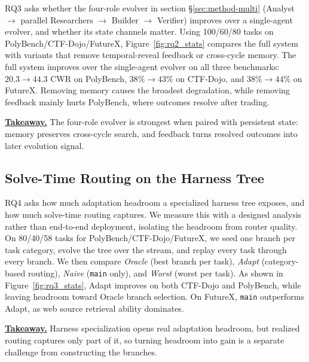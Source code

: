 RQ3 asks whether the four-role evolver in section \S\ref{sec:method-multi} (Analyst $\to$ parallel Researchers $\to$ Builder $\to$ Verifier) improves over a single-agent evolver, and whether its state channels matter. Using 100/60/80 tasks on PolyBench/CTF-Dojo/FutureX, Figure~\ref{fig:rq2_stats} compares the full system with variants that remove temporal-reveal feedback or cross-cycle memory. The full system improves over the single-agent evolver on all three benchmarks: $20.3 \to 44.3$ CWR on PolyBench, $38\% \to 43\%$ on CTF-Dojo, and $38\% \to 44\%$ on FutureX. Removing memory causes the broadest degradation, while removing feedback mainly hurts PolyBench, where outcomes resolve after trading. 

\noindent\underline{\textbf{Takeaway.}} The four-role evolver is strongest when paired with persistent state: memory preserves cross-cycle search, and feedback turns resolved outcomes into later evolution signal.



\subsection{Solve-Time Routing on the Harness Tree}
\label{sec:navloss}

RQ4 asks how much adaptation headroom a specialized harness tree exposes, and how much solve-time routing captures. We measure this with a designed analysis rather than end-to-end deployment, isolating the headroom from router quality. On 80/40/58 tasks for PolyBench/CTF-Dojo/FutureX, we seed one branch per task category, evolve the tree over the stream, and replay every task through every branch. We then compare \emph{Oracle} (best branch per task), \emph{Adapt} (category-based routing), \emph{Naive} (\texttt{main} only), and \emph{Worst} (worst per task). As shown in Figure~\ref{fig:rq3_stats}, Adapt improves on both CTF-Dojo and PolyBench, while leaving headroom toward Oracle branch selection. On FutureX, \texttt{main} outperforms Adapt, as web source retrieval ability dominates.

\noindent\underline{\textbf{Takeaway.}} Harness specialization opens real adaptation headroom, but realized routing captures only part of it, so turning headroom into gain is a separate challenge from constructing the branches.

